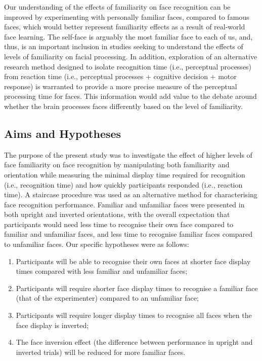 \documentclass[
  10pt,
  letterpaper,
]{article}
\begin{document}
Our understanding of the effects of familiarity on face recognition can
be improved by experimenting with personally familiar faces, compared to
famous faces, which would better represent familiarity effects as a
result of real-world face learning. The self-face is arguably the most
familiar face to each of us, and, thus, is an important inclusion in
studies seeking to understand the effects of levels of familiarity on
facial processing. In addition, exploration of an alternative research
method designed to isolate recognition time (i.e., perceptual processes)
from reaction time (i.e., perceptual processes + cognitive decision +
motor response) is warranted to provide a more precise measure of the
perceptual processing time for faces. This information would add value
to the debate around whether the brain processes faces differently based
on the level of familiarity.

\subsection{Aims and Hypotheses}\label{aims-and-hypotheses}

The purpose of the present study was to investigate the effect of higher
levels of face familiarity on face recognition by manipulating both
familiarity and orientation while measuring the minimal display time
required for recognition (i.e., recognition time) and how quickly
participants responded (i.e., reaction time). A staircase procedure was
used as an alternative method for characterising face recognition
performance. Familiar and unfamiliar faces were presented in both
upright and inverted orientations, with the overall expectation that
participants would need less time to recognise their own face compared
to familiar and unfamiliar faces, and less time to recognise familiar
faces compared to unfamiliar faces. Our specific hypotheses were as
follows:

\begin{enumerate}
\def\labelenumi{\arabic{enumi}.}
\item
  Participants will be able to recognise their own faces at shorter face
  display times compared with less familiar and unfamiliar faces;
\item
  Participants will require shorter face display times to recognise a
  familiar face (that of the experimenter) compared to an unfamiliar
  face;
\item
  Participants will require longer display times to recognise all faces
  when the face display is inverted;
\item
  The face inversion effect (the difference between performance in
  upright and inverted trials) will be reduced for more familiar faces.
\end{enumerate}
\end{document}
